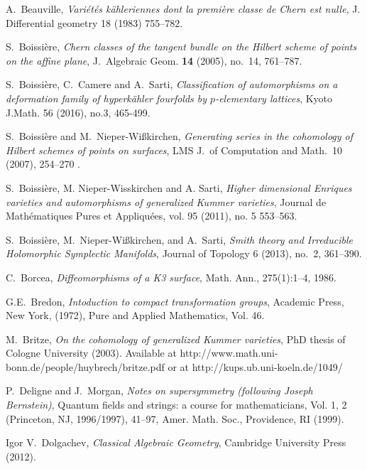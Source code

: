 
\begin{thebibliography}{10}

A.~Beauville, \emph{Vari\'et\'es k\"ahleriennes dont la premi\`ere classe de Chern est nulle}, 
  J. Differential geometry 18 (1983) 755--782.

S.~Boissi\`ere, \emph{Chern classes of the tangent bundle on the Hilbert scheme of points
  on the affine plane}, J.~Algebraic Geom. \textbf{14} (2005), no.~14, 761--787.

S.~Boissi\`ere, C.~Camere and A.~Sarti, \emph{Classification of automorphisms on a deformation family of hyperk\"ahler
fourfolds by $p$-elementary lattices}, 
Kyoto J.Math. 56 (2016), no.3, 465-499.

S.~Boissi\`ere and M.~Nieper-Wi{\ss}kirchen, \emph{Generating series in the cohomology 
  of Hilbert schemes of points on surfaces}, LMS J.~of Computation and Math.~10 (2007), 254--270 .

S.~Boissi\`ere, M. Nieper-Wisskirchen and A. Sarti, 
\emph{Higher dimensional Enriques varieties and automorphisms of generalized Kummer varieties},
Journal de Math\'ematiques Pures et Appliqu\'ees,
vol. 95 (2011), no. 5 553--563.

S.~Boissi\`ere, M.~Nieper-Wi{\ss}kirchen, and A.~Sarti, \emph{Smith theory and 
  Irreducible Holomorphic Symplectic Manifolds}, Journal of Topology 6 (2013), no.~2, 361--390.

C.~Borcea,
\emph{Diffeomorphisms of a K3 surface},
Math. Ann., 275(1):1--4, 1986.

G.E.~Bredon,
\newblock \emph{Intoduction to compact transformation groups},
Academic Press, New York,
(1972), Pure and Applied Mathematics, Vol. 46.

M.~Britze, \emph{On the cohomology of generalized Kummer varieties}, PhD thesis of Cologne University (2003). 
Available at http://www.math.uni-bonn.de/people/huybrech/britze.pdf or at http://kups.ub.uni-koeln.de/1049/

P.~Deligne and J.~Morgan, \emph{Notes on supersymmetry (following Joseph Bernstein)}, Quantum
fields and strings: a course for mathematicians, Vol. 1, 2 (Princeton, NJ, 1996/1997), 41--97,
Amer. Math. Soc., Providence, RI (1999).

Igor V.~Dolgachev, \emph{Classical Algebraic Geometry}, 
  Cambridge University Press (2012).


\end{thebibliography}
